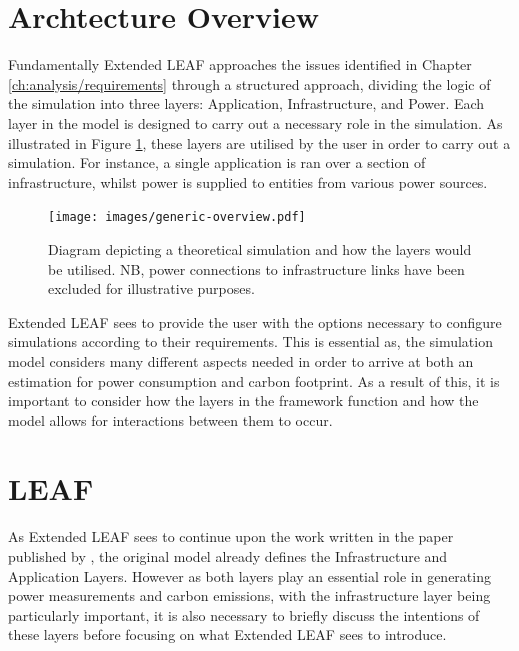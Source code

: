 \documentclass{l4proj}
\begin{document}
\section{Archtecture Overview}\label{sec:architecture-overview}
Fundamentally Extended LEAF approaches the issues identified in Chapter \ref{ch:analysis/requirements} through a structured approach, dividing the logic of the simulation into three layers: Application, Infrastructure, and Power.
Each layer in the model is designed to carry out a necessary role in the simulation.
As illustrated in Figure \ref{fig:generic-overview}, these layers are utilised by the user in order to carry out a simulation.
For instance, a single application is ran over a section of infrastructure, whilst power is supplied to entities from various power sources.

\begin{figure}[htbp]
    \centering
    \texttt{[image: images/generic-overview.pdf]}
    ~
    \caption{Diagram depicting a theoretical simulation and how the layers would be utilised. NB, power connections to infrastructure links have been excluded for illustrative purposes.}
    \label{fig:generic-overview}
\end{figure}

Extended LEAF sees to provide the user with the options necessary to configure simulations according to their requirements.
This is essential as, the simulation model considers many different aspects needed in order to arrive at both an estimation for power consumption and carbon footprint.
As a result of this, it is important to consider how the layers in the framework function and how the model allows for interactions between them to occur.

\section{LEAF}\label{sec:LEAF}
As Extended LEAF sees to continue upon the work written in the paper published by \cite{leaf2021}, the original model already defines the Infrastructure and Application Layers.
However as both layers play an essential role in generating power measurements and carbon emissions, with the infrastructure layer being particularly important, it is also necessary to briefly discuss the intentions of these layers before focusing on what Extended LEAF sees to introduce.
\end{document}
